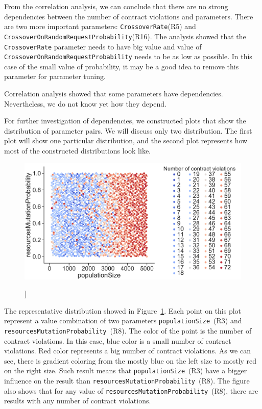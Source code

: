 From the correlation analysis, we can conclude that there are no strong dependencies between the number of contract violations and parameters. There are two more important parameters: \texttt{CrossoverRate}(R5) and \texttt{CrossoverOnRandomRequestProbability}(R16).
The analysis showed that the \texttt{CrossoverRate} parameter needs to have big value and value of \texttt{CrossoverOnRandomRequestProbability} needs to be as low as possible. In this case of the small value of probability, it may be a good idea to remove this parameter for parameter tuning.

Correlation analysis showed that some parameters have dependencies. Nevertheless, we do not know yet how they depend.

For further investigation of dependencies, we constructed plots that show the distribution of parameter pairs. We will discuss only two distribution. The first plot will show one particular distribution, and the second plot represents how most of the constructed distributions look like.

\begin{figure}
	\centering
	\includegraphics[width=\textwidth]{images/populatioSizeVsResMutationProbability.pdf}
	\caption[]]{}
	\label{fig:populatioSizeVsResMutationProbability}
\end{figure}

The representative distribution showed in Figure~\ref{fig:populatioSizeVsResMutationProbability}. Each point on this plot represent a value combination of two parameters \texttt{populationSize}~(R3) and \texttt{resourcesMutationProbability}~(R8). The color of the point is the number of contract violations. In this case, blue color is a small number of contract violations. Red color represents a big number of contract violations. As we can see, there is gradient coloring from the mostly blue on the left size to mostly red on the right size. Such result means that \texttt{populationSize}~(R3) have a bigger influence on the result than \texttt{resourcesMutationProbability}~(R8). The figure also shows that for any value of \texttt{resourcesMutationProbability}~(R8), there are results with any number of contract violations.

